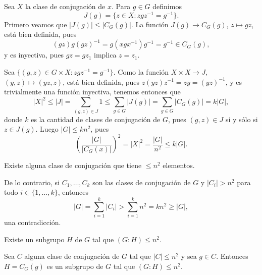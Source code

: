 Sea $X$ la clase de conjugación de $x$. Para $g\in G$ definimos
\[
J(g)=\{z\in X:zgz^{-1}=g^{-1}\}.
\]
Primero veamos que $|J(g)|\leq|C_G(g)|$. La función $J(g)\to C_G(g)$, $z\mapsto gz$, está bien definida, 
pues 
\[
(gz)g(gz)^{-1}=g(xgx^{-1})g^{-1}=g^{-1}\in C_G(g),
\]
y es inyectiva, pues $gz=gz_1$ implica $z=z_1$.

Sea $\{(g,z)\in G\times X:zgz^{-1}=g^{-1}\}$.  
Como la función $X\times X\to J$, $(y,z)\mapsto (yz,z)$, 
está bien definida, pues $z(yz)z^{-1}=zy=(yz)^{-1}$, y es trivialmente una función inyectiva, 
tenemos entonces que
\[
|X|^2\leq |J|=\sum_{(g,z)\in J}1\leq\sum_{g\in G}|J(g)|=\sum_{g\in G}|C_G(g)|=k|G|,
\]
donde $k$ es la cantidad de clases de conjugación de $G$, 
pues $(g,z)\in J$ si y sólo si $z\in J(g)$. Luego $|G|\leq kn^2$, pues
\[
\left(\frac{|G|}{|C_G(x)|}\right)^2=|X|^2=\frac{|G|}{n^2}\leq k|G|.
\]

\begin{claim}
Existe alguna clase de conjugación que tiene $\leq n^2$ elementos.
\end{claim}

De lo contrario, si $C_1,\dots,C_k$ son las clases de conjugación de $G$ y 
$|C_i|>n^2$ para todo $i\in\{1,\dots,k\}$, entonces 
\[
|G|=\sum_{i=1}^k|C_i|>\sum_{i=1}^kn^2=kn^2\geq |G|,
\]
una contradicción. 

\begin{claim}
Existe un subgrupo $H$ de $G$ tal que $(G:H)\leq n^2$.
\end{claim}

Sea $C$ alguna clase de conjugación de $G$ tal que $|C|\leq n^2$ y sea $g\in C$.  
Entonces $H=C_G(g)$ es un subgrupo de $G$ tal que $(G:H)\leq n^2$. 
